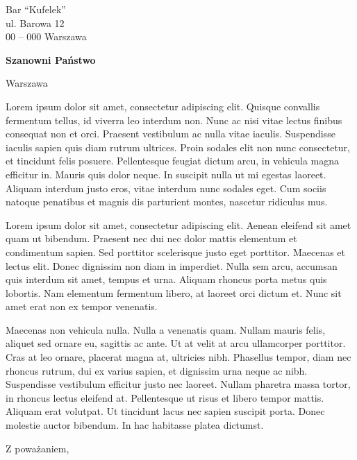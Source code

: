 \documentclass[12pt]{konserw-list} %
\begin{document}
\begin{letter}{Bar ``Kufelek'' \\ ul. Barowa 12 \\  00 -- 000 Warszawa }
\opening{{\bfseries Szanowni Państwo}}{Warszawa}
\setlength{\parindent}{1cm}

 Lorem ipsum dolor sit amet, consectetur adipiscing elit. Quisque convallis fermentum tellus, id viverra leo interdum non. Nunc ac nisi vitae lectus finibus consequat non et orci. Praesent vestibulum ac nulla vitae iaculis. Suspendisse iaculis sapien quis diam rutrum ultrices. Proin sodales elit non nunc consectetur, et tincidunt felis posuere. Pellentesque feugiat dictum arcu, in vehicula magna efficitur in. Mauris quis dolor neque. In suscipit nulla ut mi egestas laoreet. Aliquam interdum justo eros, vitae interdum nunc sodales eget. Cum sociis natoque penatibus et magnis dis parturient montes, nascetur ridiculus mus. 

Lorem ipsum dolor sit amet, consectetur adipiscing elit. Aenean eleifend sit amet quam ut bibendum. Praesent nec dui nec dolor mattis elementum et condimentum sapien. Sed porttitor scelerisque justo eget porttitor. Maecenas et lectus elit. Donec dignissim non diam in imperdiet. Nulla sem arcu, accumsan quis interdum sit amet, tempus et urna. Aliquam rhoncus porta metus quis lobortis. Nam elementum fermentum libero, at laoreet orci dictum et. Nunc sit amet erat non ex tempor venenatis. 

Maecenas non vehicula nulla. Nulla a venenatis quam. Nullam mauris felis, aliquet sed ornare eu, sagittis ac ante. Ut at velit at arcu ullamcorper porttitor. Cras at leo ornare, placerat magna at, ultricies nibh. Phasellus tempor, diam nec rhoncus rutrum, dui ex varius sapien, et dignissim urna neque ac nibh. Suspendisse vestibulum efficitur justo nec laoreet. Nullam pharetra massa tortor, in rhoncus lectus eleifend at. Pellentesque ut risus et libero tempor mattis. Aliquam erat volutpat. Ut tincidunt lacus nec sapien suscipit porta. Donec molestie auctor bibendum. In hac habitasse platea dictumst. 


\closing{Z poważaniem,}

\end{letter}
\end{document}
